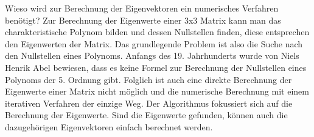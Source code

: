 \begin{refsection}
Wieso wird zur Berechnung der Eigenvektoren ein numerisches Verfahren benötigt?
Zur Berechnung der Eigenwerte einer 3x3 Matrix kann man das charakteristische Polynom bilden und dessen Nullstellen finden, diese entsprechen den Eigenwerten der Matrix.
Das grundlegende Problem ist also die Suche nach den Nullstellen eines Polynoms.
Anfangs des 19. Jahrhunderts wurde von Niels Henrik Abel bewiesen, dass es keine Formel zur Berechnung der Nullstellen eines Polynoms der 5. Ordnung gibt.
Folglich ist auch eine direkte Berechnung der Eigenwerte einer Matrix nicht möglich und die numerische Berechnung mit einem iterativen Verfahren der einzige Weg.
Der Algorithmus fokussiert sich auf die Berechnung der Eigenwerte.
Sind die Eigenwerte gefunden, können auch die dazugehörigen Eigenvektoren einfach berechnet werden.







\printbibliography[heading=subbibliography]
\end{refsection}
